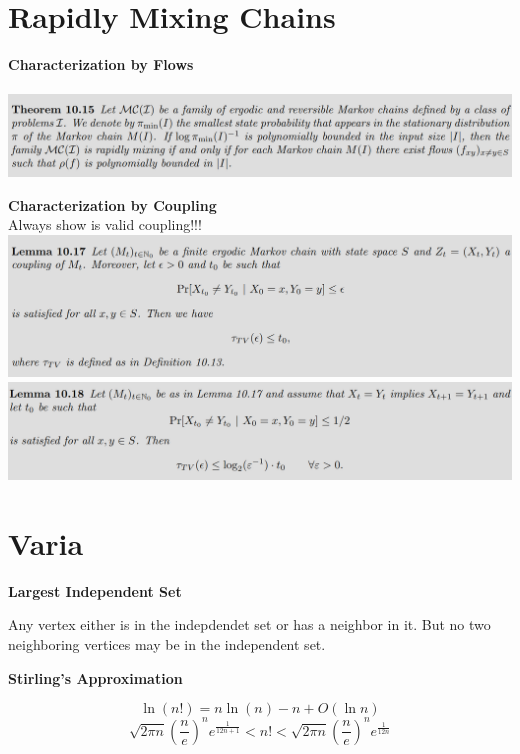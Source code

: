 \documentclass[25pt]{sciposter}
\newenvironment{defn}[1]{\begin{mdframed}[backgroundcolor=PineGreen!20,innertopmargin=15pt, innerbottommargin=15pt, nobreak=true]
		\textbf{#1 }
	}
	{ 
	\end{mdframed}
}
\begin{document}
\begin{multicols}{3}
\section{Rapidly Mixing Chains}
\textbf{Characterization by Flows}\\\\
\includegraphics[width=\linewidth]{screenshot019}

\textbf{Characterization by Coupling}\\
Always show is valid coupling!!!\\
\includegraphics[width=1\linewidth]{screenshot018}
\includegraphics[width=\linewidth]{screenshot017}



		\section{Varia}
		\begin{defn}{Largest Independent Set}
Any vertex either is in the indepdendet set or has a neighbor in it. But no two neighboring vertices may be in the independent set.
		\end{defn}
		
		\begin{defn}{Stirling's Approximation}
			
\begin{equation*}
	\ln(n!) = n \ln (n) -n + O(\ln n)
\end{equation*}
\begin{equation*}
	\sqrt{2\pi n} \left(\frac{n}{e}\right)^n e^{\frac{1}{12n + 1}} < n! < 	\sqrt{2\pi n} \left(\frac{n}{e}\right)^n e^{\frac{1}{12n}}
\end{equation*}
\end{defn}		
		


\end{multicols}
\end{document}
